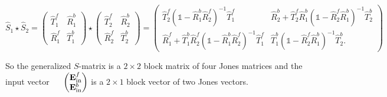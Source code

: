 \begin{equation}\label{eq:bg:star}
    \hat S_1 \star \hat S_2 =
    \begin{pmatrix}
        \hat T^f_1 & \hat R^b_1 \\
        \hat R^f_1 & \hat T^b_1
    \end{pmatrix}
    \star
    \begin{pmatrix}
        \hat T^f_2 & \hat R^b_2 \\
        \hat R^f_2 & \hat T^b_2
    \end{pmatrix}
    =
    \begin{pmatrix}
        \hat T^f_2 (\mathds 1 - \hat R^b_1 \hat R^f_2)^{-1} \hat T^f_1 &
        \hat R^b_2 + \hat T^f_2 \hat R^b_1 (\mathds 1 - \hat R^f_2 \hat R^b_1)^{-1} \hat T^b_2\\
        \hat R^f_1 + \hat T^b_1 \hat R^f_2 (\mathds 1 - \hat R^b_1 \hat R^f_2)^{-1} \hat T^f_1 &
        \hat T^b_1 (\mathds 1 - \hat R^f_2 \hat R^b_1)^{-1} \hat T^b_2.
    \end{pmatrix}
\end{equation}

So the generalized $S$-matrix is a $2 \times 2$ block matrix of four Jones matrices and the input vector $\quad $
$
\begin{pmatrix}
    \vb E^f_{\mathrm{in}} \\
    \vb E^b_{\mathrm{in}}
\end{pmatrix}
$
is a $2 \times 1$ block vector of two Jones vectors.
